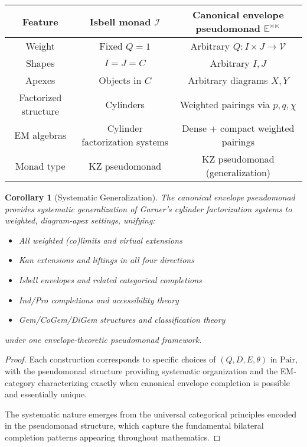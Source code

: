 \documentclass[11pt]{article}
\theoremstyle{plain}
\newtheorem{corollary}[theorem]{Corollary}
\theoremstyle{definition}
\theoremstyle{remark}
\newcommand{\V}{\mathcal{V}}
\newcommand{\Pair}{\mathrm{Pair}}
\begin{document}
\begin{center}
\begin{tabular}{|c|c|c|}
\hline
\textbf{Feature} & \textbf{Isbell monad $\mathcal{I}$} & \textbf{Canonical envelope pseudomonad $\mathbb{E}^{\rtimes \ltimes}$} \\
\hline
Weight & Fixed $Q = 1$ & Arbitrary $Q : I \times J \to \V$ \\
\hline
Shapes & $I = J = C$ & Arbitrary $I, J$ \\
\hline
Apexes & Objects in $C$ & Arbitrary diagrams $X, Y$ \\
\hline
Factorized structure & Cylinders & Weighted pairings via $p, q, \chi$ \\
\hline
EM algebras & Cylinder factorization systems & Dense + compact weighted pairings \\
\hline
Monad type & KZ pseudomonad & KZ pseudomonad (generalization) \\
\hline
\end{tabular}
\end{center}

\begin{corollary}[Systematic Generalization]
The canonical envelope pseudomonad provides systematic generalization of Garner's cylinder factorization systems to weighted, diagram-apex settings, unifying:
\begin{itemize}
\item All weighted (co)limits and virtual extensions
\item Kan extensions and liftings in all four directions
\item Isbell envelopes and related categorical completions
\item Ind/Pro completions and accessibility theory
\item Gem/CoGem/DiGem structures and classification theory
\end{itemize}
under one envelope-theoretic pseudomonad framework.
\end{corollary}

\begin{proof}
Each construction corresponds to specific choices of $(Q, D, E, \theta)$ in $\Pair$, with the pseudomonad structure providing systematic organization and the EM-category characterizing exactly when canonical envelope completion is possible and essentially unique.

The systematic nature emerges from the universal categorical principles encoded in the pseudomonad structure, which capture the fundamental bilateral completion patterns appearing throughout mathematics.
\end{proof}
\end{document}
